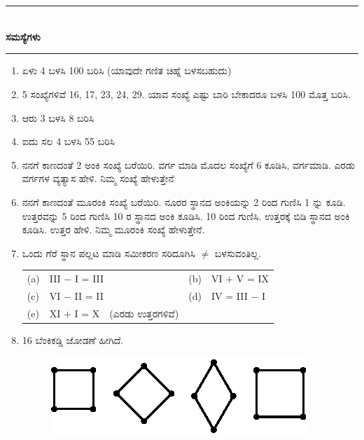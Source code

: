 \chapter[ಅಧ್ಯಾಯ 5]{}\label{chap5}

\begin{center}
\rule{5cm}{1pt}\\[5pt]
{\Large\bfseries ಸಮಸ್ಯೆಗಳು}\\[3pt]
\rule{5cm}{1pt}
\end{center}

\begin{enumerate}
\renewcommand{\labelenumi}{\bf\theenumi.}
\itemsep=5pt

\item ಏಳು 4 ಬಳಸಿ 100 ಬರಿಸಿ (ಯಾವುದೇ ಗಣಿತ ಚಿಹ್ನೆ ಬಳಸಬಹುದು)

\item 5 ಸಂಖ್ಯೆಗಳಿವೆ 16, 17, 23, 24, 29. ಯಾವ ಸಂಖ್ಯೆ ಎಷ್ಟು ಬಾರಿ ಬೇಕಾದರೂ ಬಳಸಿ 100 ಮೊತ್ತ ಬರಿಸಿ.  

\item ಆರು 3 ಬಳಸಿ 8 ಬರಿಸಿ

\item ಐದು ಸಲ 4 ಬಳಸಿ 55 ಬರಿಸಿ 

\item ನನಗೆ ಕಾಣದಂತೆ 2 ಅಂಕಿ ಸಂಖ್ಯೆ ಬರೆಯಿರಿ. ವರ್ಗ ಮಾಡಿ ಮೊದಲ ಸಂಖ್ಯೆಗೆ 6 ಕೂಡಿಸಿ, ವರ್ಗಮಾಡಿ. ಎರಡು ವರ್ಗಗಳ ವ್ಯತ್ಯಾಸ ಹೇಳಿ. ನಿಮ್ಮ ಸಂಖ್ಯೆ ಹೇಳುತ್ತೇನೆ

\item ನನಗೆ ಕಾಣದಂತೆ ಮೂರಂಕಿ ಸಂಖ್ಯೆ ಬರೆಯಿರಿ. ನೂರರ ಸ್ಥಾನದ ಅಂಕಿಯನ್ನು 2 ರಿಂದ ಗುಣಿಸಿ 1 ನ್ನು ಕೂಡಿ. ಉತ್ತರವನ್ನು 5 ರಿಂದ ಗುಣಿಸಿ 10 ರ ಸ್ಥಾನದ ಅಂಕಿ ಕೂಡಿಸಿ. 10 ರಿಂದ ಗುಣಿಸಿ. ಉತ್ತರಕ್ಕೆ ಬಿಡಿ ಸ್ಥಾನದ ಅಂಕಿ ಕೂಡಿಸಿ. ಉತ್ತರ ಹೇಳಿ. ನಿಮ್ಮ ಮೂರಂಕಿ ಸಂಖ್ಯೆ ಹೇಳುತ್ತೇನೆ.

\item ಒಂದು ಗೆರೆ ಸ್ಥಾನ ಪಲ್ಲಟ ಮಾಡಿ ಸಮೀಕರಣ ಸರಿದೂಗಿಸಿ $\neq$ ಬಳಸುವಂತಿಲ್ಲ.

\begin{tabular}{l@{\,}ll@{\,}l}
(a)& III $-$ I = III &(b) & VI $+$ V = IX\\
(c)& VI $-$ II = II &(d) & IV = III $-$ I\\
(e)& XI $+$ I = X~~(ಎರಡು ಉತ್ತರಗಳಿವೆ) & &
\end{tabular}

\eject

\item 16 ಬೆಂಕಿಕಡ್ಡಿ ಜೋಡಣೆ ಹೀಗಿದೆ.
\begin{figure}[H]
\centering
\includegraphics[scale=.9]{images/chap5/q8.eps}
\end{figure} 


\end{enumerate}
